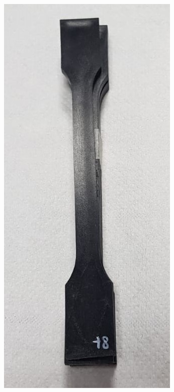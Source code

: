 \documentclass[a4paper, 11pt]{article}
\begin{document}
\begin{figure}[htp]
{\includegraphics[scale=0.2]{PPB}} \qquad
\subfloat[][]

\end{figure}
\end{document}
